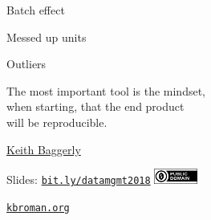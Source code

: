 \documentclass[12pt,t]{beamer}
\begin{document}
\begin{frame}[c]{Batch effect}




\end{frame}



\begin{frame}[c]{Messed up units}



\end{frame}



\begin{frame}[c]{Outliers}


\end{frame}




\begin{frame}[c]{}

\begin{center}
\large
The most important tool is the {\hilit mindset},\\
when starting, that the end product \\
will be reproducible.
\end{center}

\hfill
{\lolit
{\textendash} \href{http://odin.mdacc.tmc.edu/~kabaggerly/}{Keith Baggerly}
}

\end{frame}



\begin{frame}[c]{}

\Large

Slides: \href{https://bit.ly/datamgmt2018}{\tt bit.ly/datamgmt2018} \quad
\includegraphics[height=5mm]{Figs/cc-zero.png}

\vspace{10mm}

\href{http://kbroman.org}{\tt \lolit kbroman.org}


\end{frame}
\end{document}
